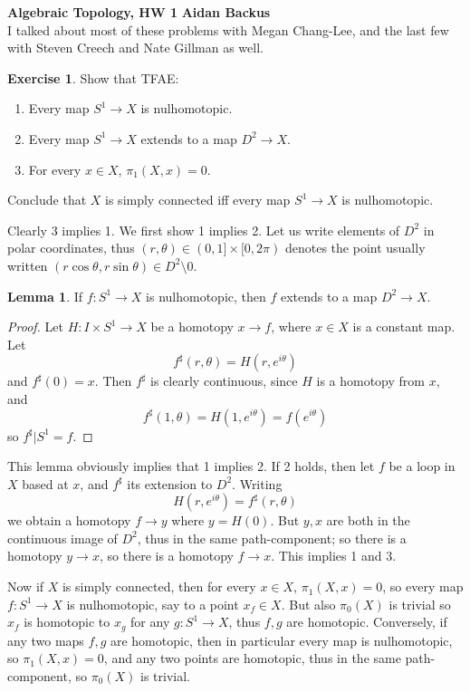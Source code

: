 \documentclass[10pt]{article}
\theoremstyle{definition}
\newtheorem{exer}{Exercise}
\newtheorem{lemma}{Lemma}[exer]
\begin{document}
\noindent
\large\textbf{Algebraic Topology, HW 1} \hfill \textbf{Aidan Backus} \\


I talked about most of these problems with Megan Chang-Lee, and the last few with Steven Creech and Nate Gillman as well.

\begin{exer}
Show that TFAE:
\begin{enumerate}
\item Every map $S^1 \to X$ is nulhomotopic.
\item Every map $S^1 \to X$ extends to a map $D^2 \to X$.
\item For every $x \in X$, $\pi_1(X, x) = 0$.
\end{enumerate}
Conclude that $X$ is simply connected iff every map $S^1 \to X$ is nulhomotopic.
\end{exer}

Clearly 3 implies 1.
We first show 1 implies 2.
Let us write elements of $D^2$ in polar coordinates, thus $(r, \theta) \in (0, 1] \times [0, 2\pi)$ denotes the point usually written $(r \cos \theta, r \sin \theta) \in D^2 \setminus 0$.

\begin{lemma}
If $f: S^1 \to X$ is nulhomotopic, then $f$ extends to a map $D^2 \to X$.
\end{lemma}
\begin{proof}
Let $H: I \times S^1 \to X$ be a homotopy $x \to f$, where $x \in X$ is a constant map.
Let
$$f^\sharp(r, \theta) = H(r, e^{i\theta})$$
and $f^\sharp(0) = x$. Then $f^\sharp$ is clearly continuous, since $H$ is a homotopy from $x$, and
$$f^\sharp(1, \theta) = H(1, e^{i\theta}) = f(e^{i\theta})$$
so $f^\sharp|S^1 = f$.
\end{proof}

This lemma obviously implies that 1 implies 2.
If 2 holds, then let $f$ be a loop in $X$ based at $x$, and $f^\sharp$ its extension to $D^2$.
Writing
$$H(r, e^{i\theta}) = f^\sharp(r, \theta)$$
we obtain a homotopy $f \to y$ where $y = H(0)$. But $y, x$ are both in the continuous image of $D^2$, thus in the same path-component; so there is a homotopy $y \to x$, so there is a homotopy $f \to x$. This implies 1 and 3.

Now if $X$ is simply connected, then for every $x \in X$, $\pi_1(X, x) = 0$, so every map $f: S^1 \to X$ is nulhomotopic, say to a point $x_f \in X$. But also $\pi_0(X)$ is trivial so $x_f$ is homotopic to $x_g$ for any $g: S^1 \to X$, thus $f,g$ are homotopic.
Conversely, if any two maps $f,g$ are homotopic, then in particular every map is nulhomotopic, so $\pi_1(X, x) = 0$, and any two points are homotopic, thus in the same path-component, so $\pi_0(X)$ is trivial.
\end{document}

